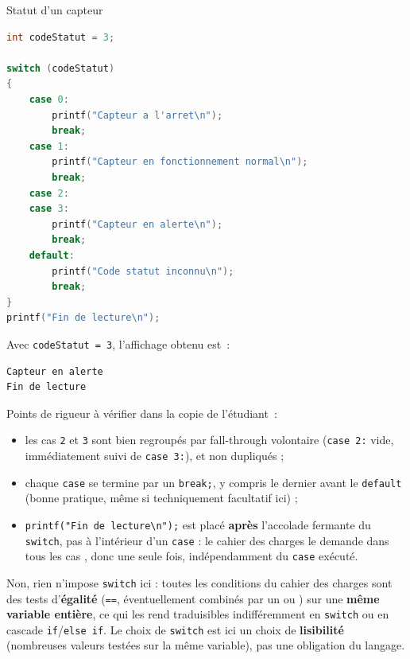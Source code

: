 \begin{UPSTIprofOnlyEnv}
    \begin{UPSTIcorrectionP}{Statut d'un capteur}
        \begin{lstlisting}[language=c]
int codeStatut = 3;

switch (codeStatut)
{
    case 0:
        printf("Capteur a l'arret\n");
        break;
    case 1:
        printf("Capteur en fonctionnement normal\n");
        break;
    case 2:
    case 3:
        printf("Capteur en alerte\n");
        break;
    default:
        printf("Code statut inconnu\n");
        break;
}
printf("Fin de lecture\n");
        \end{lstlisting}
        Avec \texttt{codeStatut = 3}, l'affichage obtenu est~:
        \begin{lstlisting}[language=bash,style=console]
Capteur en alerte
Fin de lecture
        \end{lstlisting}
        Points de rigueur à vérifier dans la copie de l'étudiant~:
        \begin{itemize}
            \item les cas \texttt{2} et \texttt{3} sont bien regroupés par fall-through volontaire (\texttt{case 2:} vide, immédiatement suivi de \texttt{case 3:}), et non dupliqués ;
            \item chaque \texttt{case} se termine par un \texttt{break;}, y compris le dernier avant le \texttt{default} (bonne pratique, même si techniquement facultatif ici) ;
            \item \texttt{printf("Fin de lecture\textbackslash n");} est placé \textbf{après} l'accolade fermante du \texttt{switch}, pas à l'intérieur d'un \texttt{case} : le cahier des charges le demande \og dans tous les cas \fg, donc une seule fois, indépendamment du \texttt{case} exécuté.
        \end{itemize}

        Non, rien n'impose \texttt{switch} ici : toutes les conditions du cahier des charges sont des tests d'\textbf{égalité} (\texttt{==}, éventuellement combinés par un \og ou \fg) sur une \textbf{même variable entière}, ce qui les rend traduisibles indifféremment en \texttt{switch} ou en cascade \texttt{if}/\texttt{else if}. Le choix de \texttt{switch} est ici un choix de \textbf{lisibilité} (nombreuses valeurs testées sur la même variable), pas une obligation du langage.
    \end{UPSTIcorrectionP}
\end{UPSTIprofOnlyEnv}

